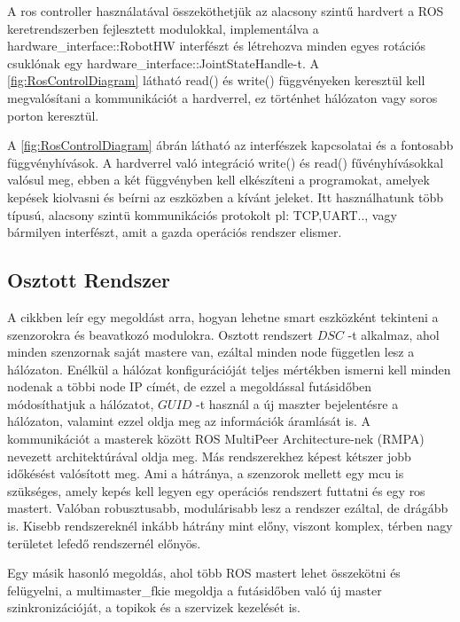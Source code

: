 A ros controller  \cite{roscontrol} használatával összeköthetjük az alacsony szintű hardvert a ROS keretrendszerben fejlesztett modulokkal, implementálva \cite{ROSControlExample} a hardware\_interface::RobotHW interfészt és létrehozva minden egyes rotációs csuklónak egy \newline hardware\_interface::JointStateHandle-t. A \ref{fig:RosControlDiagram} látható read() és write() függvényeken keresztül kell megvalósítani a kommunikációt a hardverrel, ez történhet hálózaton vagy soros porton keresztül.

\renewcommand{\img}{AktualisTudomany/roscontrol.png}
\renewcommand{\sources}{Forrás: https://www.army-technology.com}
\renewcommand{\captionn}{Ros Control modulok}
\renewcommand{\figlabel}{RosControlDiagram}


A \ref{fig:RosControlDiagram} ábrán látható az interfészek kapcsolatai és a fontosabb függvényhívások. A hardverrel való integráció write() és read() fűvényhívásokkal valósul meg, ebben a két függvényben kell elkészíteni a programokat, amelyek kepések kiolvasni és beírni az eszközben a kívánt jeleket. Itt használhatunk több típusú, alacsony szintü kommunikációs protokolt pl: TCP,UART.., vagy bármilyen interfészt, amit a gazda operációs rendszer elismer.

\subsection*{Osztott Rendszer}

A  \cite{DistributedRealTimeControlROS} cikkben leír egy megoldást arra, hogyan lehetne smart eszközként tekinteni a szenzorokra és beavatkozó modulokra. Osztott rendszert $DSC$ -t alkalmaz, ahol minden szenzornak saját mastere van, ezáltal minden node független lesz a hálózaton. Enélkül a hálózat konfigurációját teljes mértékben ismerni kell minden nodenak a többi node IP címét, de ezzel a megoldással futásidőben módosíthatjuk a hálózatot, $GUID$ -t használ a új maszter bejelentésre a hálózaton, valamint ezzel oldja meg az információk áramlását is.
A kommunikációt a masterek között ROS MultiPeer Architecture-nek (RMPA) nevezett architektúrával oldja meg. Más rendszerekhez képest kétszer jobb időkésést valósított meg. 
Ami a hátránya, a szenzorok mellett egy mcu is szükséges, amely kepés kell legyen egy operációs rendszert futtatni és egy ros mastert. Valóban robusztusabb, modulárisabb lesz a rendszer ezáltal, de drágább is. Kisebb rendszereknél inkább hátrány mint előny, viszont komplex, térben nagy területet lefedő rendszernél előnyös.

Egy másik hasonló megoldás, ahol több ROS mastert lehet összekötni és felügyelni, a multimaster\_fkie megoldja a futásidőben való új master szinkronizációját, a topikok és a szervizek kezelését is. 


